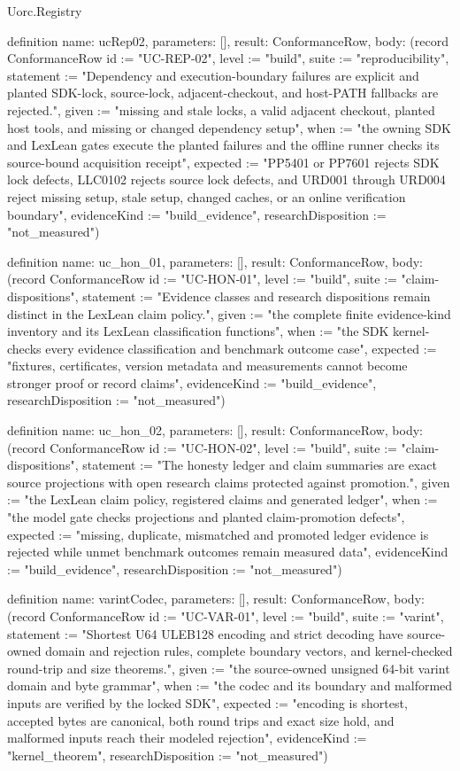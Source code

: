 \begin{lexlean}{Uorc.Registry}
\begin{semanticmodule}
definition{
  name: ucRep02,
  parameters: [],
  result: ConformanceRow,
  body: (record ConformanceRow {id := "UC-REP-02", level := "build", suite := "reproducibility", statement := "Dependency and execution-boundary failures are explicit and planted SDK-lock, source-lock, adjacent-checkout, and host-PATH fallbacks are rejected.", given := "missing and stale locks, a valid adjacent checkout, planted host tools, and missing or changed dependency setup", when := "the owning SDK and LexLean gates execute the planted failures and the offline runner checks its source-bound acquisition receipt", expected := "PP5401 or PP7601 rejects SDK lock defects, LLC0102 rejects source lock defects, and URD001 through URD004 reject missing setup, stale setup, changed caches, or an online verification boundary", evidenceKind := "build_evidence", researchDisposition := "not_measured"})
}

definition{
  name: uc_hon_01,
  parameters: [],
  result: ConformanceRow,
  body: (record ConformanceRow {id := "UC-HON-01", level := "build", suite := "claim-dispositions", statement := "Evidence classes and research dispositions remain distinct in the LexLean claim policy.", given := "the complete finite evidence-kind inventory and its LexLean classification functions", when := "the SDK kernel-checks every evidence classification and benchmark outcome case", expected := "fixtures, certificates, version metadata and measurements cannot become stronger proof or record claims", evidenceKind := "build_evidence", researchDisposition := "not_measured"})
}

definition{
  name: uc_hon_02,
  parameters: [],
  result: ConformanceRow,
  body: (record ConformanceRow {id := "UC-HON-02", level := "build", suite := "claim-dispositions", statement := "The honesty ledger and claim summaries are exact source projections with open research claims protected against promotion.", given := "the LexLean claim policy, registered claims and generated ledger", when := "the model gate checks projections and planted claim-promotion defects", expected := "missing, duplicate, mismatched and promoted ledger evidence is rejected while unmet benchmark outcomes remain measured data", evidenceKind := "build_evidence", researchDisposition := "not_measured"})
}

definition{
  name: varintCodec,
  parameters: [],
  result: ConformanceRow,
  body: (record ConformanceRow {id := "UC-VAR-01", level := "build", suite := "varint", statement := "Shortest U64 ULEB128 encoding and strict decoding have source-owned domain and rejection rules, complete boundary vectors, and kernel-checked round-trip and size theorems.", given := "the source-owned unsigned 64-bit varint domain and byte grammar", when := "the codec and its boundary and malformed inputs are verified by the locked SDK", expected := "encoding is shortest, accepted bytes are canonical, both round trips and exact size hold, and malformed inputs reach their modeled rejection", evidenceKind := "kernel_theorem", researchDisposition := "not_measured"})
}


\end{semanticmodule}
\end{lexlean}
